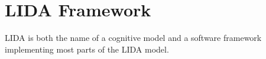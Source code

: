 \section{LIDA Framework}
\label{sec:lida}
LIDA is both the name of a cognitive model and a software framework implementing
most parts of the LIDA model.